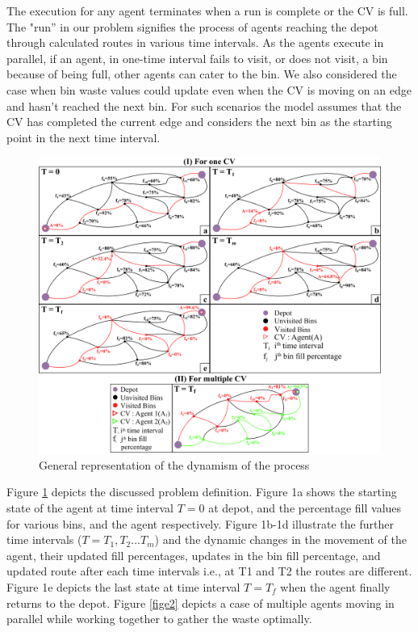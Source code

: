 \documentclass[12pt]{article}
\begin{document}
The execution for any agent terminates when a run is complete or the CV is full. The "run” in our problem signifies the process of agents reaching the depot through calculated routes in various time intervals. As the agents execute in parallel, if an agent, in one-time interval fails to visit, or does not visit, a bin because of being full, other agents can cater to the bin. We also considered the case when bin waste values could update even when the CV is moving on an edge and hasn't reached the next bin. For such scenarios the model assumes that the CV has completed the current edge and considers the next bin as the starting point in the next time interval.  

\begin{figure}[H]
    \centering
    \includegraphics[scale=0.25]{Figure 1 and 2 Combined.png}
    \caption{General representation of the dynamism of the process}\label{fige}
\end{figure}


Figure \ref{fige} depicts the discussed problem definition. Figure 1a shows the starting state of the agent at time interval $T=0$ at depot, and the percentage fill values for various bins, and the agent respectively. Figure 1b-1d illustrate the further time intervals ($T=T_1,T_2...T_m$) and the dynamic changes in the movement of the agent, their updated fill percentages, updates in the bin fill percentage, and updated route after each time intervals i.e., at T1 and T2 the routes are different. Figure 1e depicts the last state at time interval $T=T_f$ when the agent finally returns to the depot. Figure \ref{fige2} depicts a case of multiple agents moving in parallel while working together to gather the waste optimally.  
\end{document}
